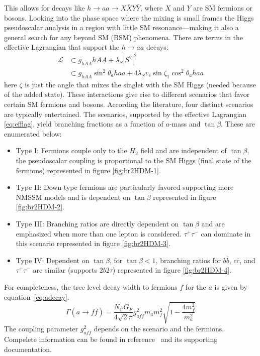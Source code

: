 This allows for decays like $h\rightarrow aa \rightarrow X\bar{X}Y\bar{Y}$, where $X$ and $Y$ are SM fermions or bosons. Looking into the phase space where the mixing is small frames the Higgs pseudoscalar analysis in a region with little SM resonance---making it also a general search for any beyond SM (BSM) phenomena.
There are terms in the effective Lagrangian that support the $h \rightarrow aa $ decays:
\begin{align}
\label{eq:efflag}
\mathcal{L} &\subset g_{hAA}hAA + \lambda_S|S^2|^2  \\
            &\subset g_{hAA}\sin^2\theta_a haa + 4\lambda_S v_s \sin{\zeta_1} \cos^2\theta_a haa \nonumber 
\end{align}
here $\zeta$ is just the angle that mixes the singlet with the SM Higgs (needed because of the added state). These interactions give rise to different scenarios that favor certain SM fermions and bosons. According the literature, four distinct scenarios are typically entertained.  The scenarios, supported by the effective Lagrangian \ref{eq:efflag}, yield branching fractions as a function of $a$-mass and $\tan\beta$.  These are enumerated below:
\begin{itemize}
\item Type I: Fermions couple only to the $H_2$ field and are independent of $\tan\beta$, the pseudoscalar coupling is proportional to the SM Higgs (final state of the fermions) represented in figure \ref{fig:br2HDM-1}.
\item Type II: Down-type fermions are particularly favored supporting more NMSSM models and is dependent on $\tan\beta$ represented in figure \ref{fig:br2HDM-2}. 
\item Type III: Branching ratios are directly dependent on $\tan\beta$ and are emphasized when more than one lepton is considered. $\tau^+ \tau^-$ can dominate in this scenario represented in figure \ref{fig:br2HDM-3}. 
\item Type IV: Dependent on $\tan\beta$, for $\tan \beta < 1 $, branching ratios for $b\bar{b}$, $c\bar{c}$, and $\tau^+ \tau^-$ are similar (supports $2b2\tau$) represented in figure \ref{fig:br2HDM-4}.
\end{itemize}

For completeness, the tree level decay width to fermions $f$ for the $a$ is given by equation~\ref{eq:adecay}.
\begin{equation}
\label{eq:adecay}
\Gamma(a \rightarrow f \bar{f}) = \frac{N_C G_F}{4\sqrt{2}\pi} g^2_{a f\bar{f}} m_a m_f^2 \sqrt{1 - \frac{4m^2_f}{m^2_a}}
\end{equation}
The coupling parameter $g^2_{a f\bar{f}}$ depends on the scenario and the fermions. Compelete information can be found in reference~\cite{Branco_2012} and its supporting documentation.


